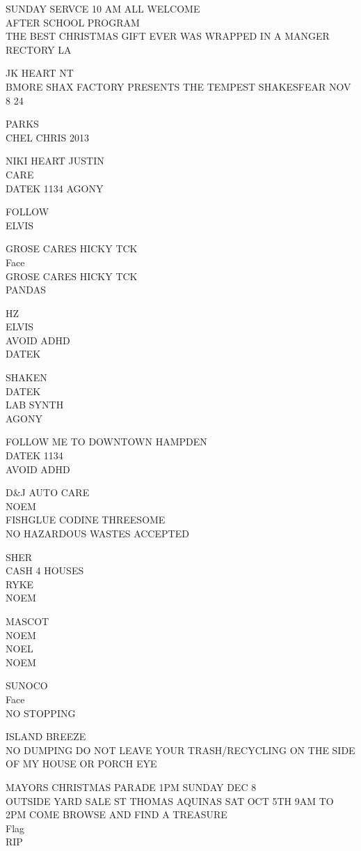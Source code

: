 \documentclass[10pt,letterpaper]{article}
\begin{document}
SUNDAY SERVCE 10 AM ALL WELCOME\\
AFTER SCHOOL PROGRAM\\
THE BEST CHRISTMAS GIFT EVER WAS WRAPPED IN A MANGER\\
RECTORY LA

JK HEART NT\\
BMORE SHAX FACTORY PRESENTS THE TEMPEST SHAKESFEAR NOV 8 24

PARKS\\
CHEL CHRIS 2013

NIKI HEART JUSTIN\\
CARE\\
DATEK 1134 AGONY

FOLLOW\\
ELVIS

GROSE CARES HICKY TCK\\
Face\\
GROSE CARES HICKY TCK\\
PANDAS

HZ\\
ELVIS\\
AVOID ADHD\\
DATEK

SHAKEN\\
DATEK\\
LAB SYNTH\\
AGONY

FOLLOW ME TO DOWNTOWN HAMPDEN\\
DATEK 1134\\
AVOID ADHD

D\&J AUTO CARE\\
NOEM\\
FISHGLUE CODINE THREESOME\\
NO HAZARDOUS WASTES ACCEPTED

SHER\\
CASH 4 HOUSES\\
RYKE\\
NOEM

MASCOT\\
NOEM\\
NOEL\\
NOEM

SUNOCO\\
Face\\
NO STOPPING

ISLAND BREEZE\\
NO DUMPING DO NOT LEAVE YOUR TRASH/RECYCLING ON THE SIDE OF MY HOUSE OR PORCH EYE

MAYORS CHRISTMAS PARADE 1PM SUNDAY DEC 8\\
OUTSIDE YARD SALE ST THOMAS AQUINAS SAT OCT 5TH 9AM TO 2PM COME BROWSE AND FIND A TREASURE\\
Flag\\
RIP
\end{document}
